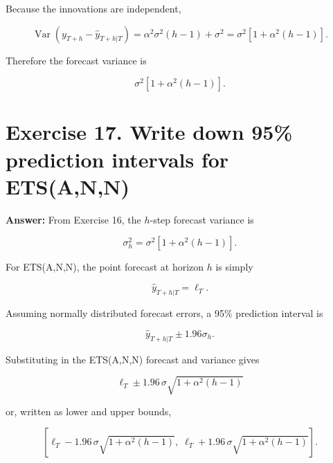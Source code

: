 \documentclass[
  11pt,
]{article}
\begin{document}
Because the innovations are independent,

\[
\operatorname{Var}(y_{T+h} - \hat{y}_{T+h|T})
= \alpha^2\sigma^2(h-1) + \sigma^2
= \sigma^2\left[1 + \alpha^2(h-1)\right].
\]

Therefore the forecast variance is

\[
\boxed{\sigma^2\left[1 + \alpha^2(h-1)\right].}
\]

\section{Exercise 17. Write down 95\% prediction intervals for
ETS(A,N,N)}\label{exercise-17.-write-down-95-prediction-intervals-for-etsann}

\textbf{Answer:} From Exercise 16, the \(h\)-step forecast variance is

\[
\sigma_h^2 = \sigma^2\left[1 + \alpha^2(h-1)\right].
\]

For ETS(A,N,N), the point forecast at horizon \(h\) is simply

\[
\hat{y}_{T+h|T} = \ell_T.
\]

Assuming normally distributed forecast errors, a 95\% prediction
interval is

\[
\hat{y}_{T+h|T} \pm 1.96\sigma_h.
\]

Substituting in the ETS(A,N,N) forecast and variance gives

\[
\boxed{
\ell_T \pm 1.96\,\sigma\sqrt{1 + \alpha^2(h-1)}
}
\]

or, written as lower and upper bounds,

\[
\boxed{
\left[
\ell_T - 1.96\,\sigma\sqrt{1 + \alpha^2(h-1)},
\;\ell_T + 1.96\,\sigma\sqrt{1 + \alpha^2(h-1)}
\right].
}
\]
\end{document}
